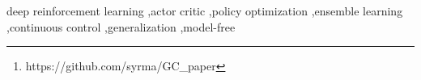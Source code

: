 \begin{abstract}
We present a general model for actor-critic policy gradient methods with Ensemble models, and test an example implementation on four robotic environments.
The source code implementing the present work as well as the experiment logs presented in section \ref{sec:exp} can be consulted and accessed online\footnote{https://github.com/syrma/GC\_paper}.
\end{abstract}

\begin{keyword}
deep reinforcement learning \sep actor critic \sep policy optimization \sep ensemble learning \sep continuous control \sep generalization \sep model-free
\end{keyword}
